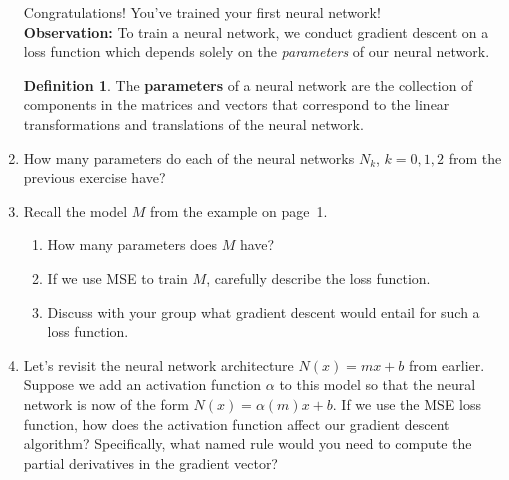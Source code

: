\documentclass[12pt]{amsart}
\theoremstyle{definition}
\newtheorem*{definition}{Definition}
\begin{document}
\begin{enumerate}[itemsep=2.5em,leftmargin=0pt]
\noindent Congratulations! You've trained your first neural network! \\

\noindent \textbf{Observation:} To train a neural network, we conduct gradient descent on a loss function which depends solely on the \textit{parameters} of our neural network.

\begin{definition}
    The \textbf{parameters} of a neural network are the collection of components in the matrices and vectors that correspond to the linear transformations and translations of the neural network.
\end{definition}

\vspace{-2em}

\item How many parameters do each of the neural networks $N_k$, $k=0,1,2$ from the previous exercise have?


\item Recall the model $M$ from the example on page~1.
\begin{enumerate}[label=(\alph*),itemsep=.5em]
    \item How many parameters does $M$ have? 
    \item If we use MSE to train $M$, carefully describe the loss function.
    \item Discuss with your group what gradient descent would entail for such a loss function.
\end{enumerate}


\item Let's revisit the neural network architecture $N(x)=mx+b$ from earlier. Suppose we add an activation function $\alpha$ to this model so that the neural network is now of the form $N(x)=\alpha(m)x+b$. If we use the MSE loss function, how does the activation function affect our gradient descent algorithm? Specifically, what named rule would you need to compute the partial derivatives in the gradient vector?


\end{enumerate}
\end{document}
